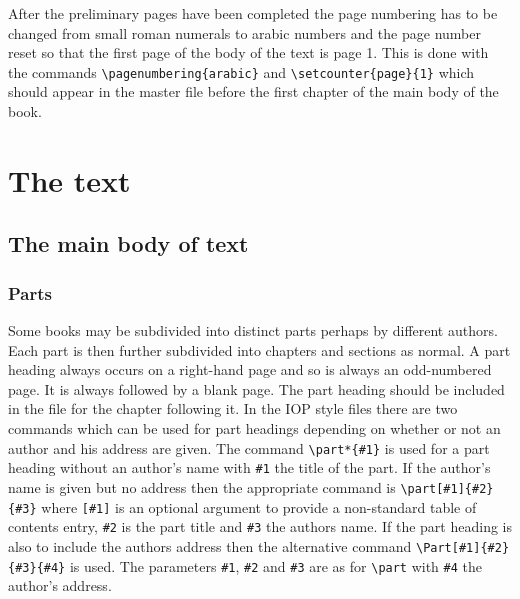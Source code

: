 After the preliminary pages have been completed the page numbering has to
be changed from small roman numerals to arabic numbers and the page number
reset so that the first page of the body of the text is page 1. This is
done with the commands
\verb"\pagenumbering{arabic}" and
\verb"\setcounter{page}{1}" 
which should appear in the master file
before the first chapter of the main body of the book.


\chapter{The text}
\section{The main body of text}
\subsection{Parts}
Some books may be subdivided into 
distinct parts perhaps by different 
authors. Each part is then further subdivided into chapters and 
sections as normal. A part heading always occurs on a right-hand page 
and so is always an odd-numbered page. It is always followed by a 
blank page. The part heading should be included in the file for the 
chapter following it. In the IOP style files 
there are two commands which can
be used for part headings depending on whether or not an author and his
address are given. The command \verb"\part*{#1}" is used for a part heading
without an author's name with \verb"#1" the title of the part. 
If the author's name is given but no address 
then the appropriate command is \verb"\part[#1]{#2}{#3}" where 
\verb"[#1]" is an optional argument to provide a non-standard 
table of contents
entry, \verb"#2" is the part title and \verb"#3" the authors name.
If the part heading is also to include the authors address then
the alternative command \verb"\Part[#1]{#2}{#3}{#4}"
is used. The parameters \verb"#1", \verb"#2" and \verb"#3" are as 
for \verb"\part" with \verb"#4"
the author's address.

